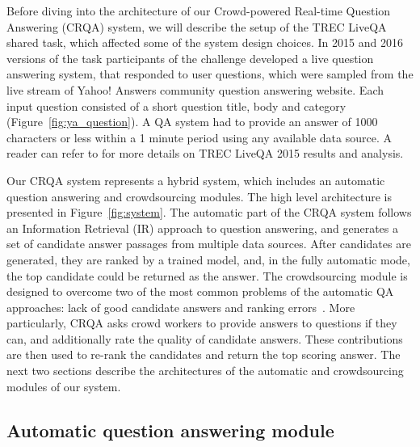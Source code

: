 \documentclass[letterpaper]{article}
\begin{document}
Before diving into the architecture of our Crowd-powered Real-time Question Answering (CRQA) system, we will describe the setup of the TREC LiveQA shared task, which affected some of the system design choices.
In 2015 and 2016 versions of the task participants of the challenge developed a live question answering system, that responded to user questions, which were sampled from the live stream of Yahoo! Answers community question answering website.
Each input question consisted of a short question title, body and category (Figure~\ref{fig:ya_question}).
A QA system had to provide an answer of 1000 characters or less within a 1 minute period using any available data source.
A reader can refer to \cite{overviewliveqa15} for more details on TREC LiveQA 2015 results and analysis.

Our CRQA system represents a hybrid system, which includes an automatic question answering and crowdsourcing modules.
The high level architecture is presented in Figure~\ref{fig:system}.
The automatic part of the CRQA system follows an Information Retrieval (IR) approach to question answering, and generates a set of candidate answer passages from multiple data sources.
After candidates are generated, they are ranked by a trained model, and, in the fully automatic mode, the top candidate could be returned as the answer.
The crowdsourcing module is designed to overcome two of the most common problems of the automatic QA approaches: lack of good candidate answers and ranking errors~\cite{moldovan2003performance,savenkov_trecliveqa15}.
More particularly, CRQA asks crowd workers to provide answers to questions if they can, and additionally rate the quality of candidate answers.
These contributions are then used to re-rank the candidates and return the top scoring answer.
The next two sections describe the architectures of the automatic and crowdsourcing modules of our system.

\subsection{Automatic question answering module}
\label{sec:system:auto}
\end{document}
